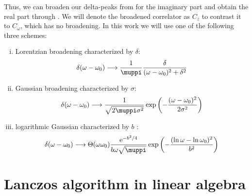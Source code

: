 Thus, we can broaden our delta-peaks from 
for the imaginary part and obtain the real part through .
We will denote the broadened correlator as $C_z$
to contrast it to $C_\omega$, which has no broadening.
In this work we will use one of the following three schemes:
\begin{enumerate}[(i)]
    \item Lorentzian broadening characterized by $\delta$:
          \label{item:lorentzian}
          \begin{equation}
              \delta(\omega - \omega_0)
              \longrightarrow
              \frac{1}{\muppi}\frac{\delta}{(\omega - \omega_0)^2 + \delta^2}
          \end{equation}
    \item Gaussian broadening characterized by $\sigma$:
          \label{item:gaussian}
          \begin{equation}
              \delta(\omega - \omega_0)
              \longrightarrow
              \frac{1}{\sqrt{2\muppi \sigma^2}}\exp\left(-\frac{(\omega - \omega_0)^2}{2\sigma^2}\right)
          \end{equation}
    \item logarithmic Gaussian characterized by $b$ \cite{Bulla2008}:
          \label{item:logarithmic-gaussian}
          \begin{equation}
              \delta(\omega - \omega_0)
              \longrightarrow
              \Theta(\omega\omega_0)\frac{\me^{-b^2/4}}{b\omega\sqrt{\muppi}}\exp\left(-\frac{(\ln\omega-\ln\omega_0)^2}{b^2}\right)
          \end{equation}
\end{enumerate}

\section{Lanczos algorithm in linear algebra}

